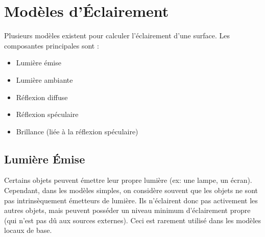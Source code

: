 \section{Modèles d'Éclairement}
Plusieurs modèles existent pour calculer l'éclairement d'une surface. Les composantes principales sont :
\begin{itemize}
    \item Lumière émise
    \item Lumière ambiante
    \item Réflexion diffuse
    \item Réflexion spéculaire
    \item Brillance (liée à la réflexion spéculaire)
\end{itemize}
\subsection{Lumière Émise}
Certains objets peuvent émettre leur propre lumière (ex: une lampe, un écran). Cependant, dans les modèles simples, on considère souvent que les objets ne sont pas intrinsèquement émetteurs de lumière. Ils n'éclairent donc pas activement les autres objets, mais peuvent posséder un niveau minimum d'éclairement propre (qui n'est pas dû aux sources externes). Ceci est rarement utilisé dans les modèles locaux de base.
